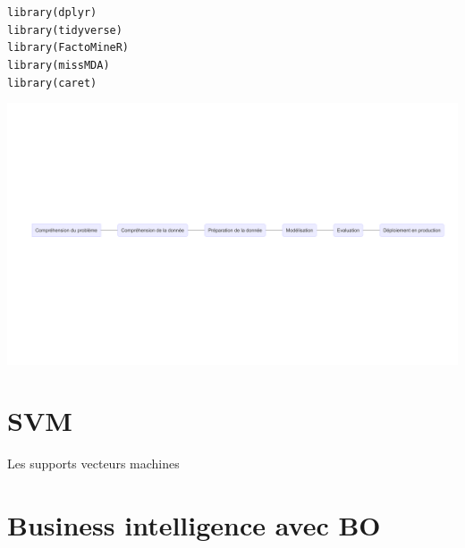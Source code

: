 \documentclass{article}\usepackage[]{graphicx}\usepackage[]{color}
\makeatletter
\def\maxwidth{ %
  \ifdim\Gin@nat@width>\linewidth
    \linewidth
  \else
    \Gin@nat@width
  \fi
}
\newcommand{\hlstd}[1]{\textcolor[rgb]{0,0,0}{#1}}%
\newcommand{\hlkwd}[1]{\textcolor[rgb]{0.004,0.004,0.506}{#1}}%
\newenvironment{kframe}{%
 \def\at@end@of@kframe{}%
 \ifinner\ifhmode%
  \def\at@end@of@kframe{\end{minipage}}%
  \begin{minipage}{\columnwidth}%
 \fi\fi%
 \def\FrameCommand##1{\hskip\@totalleftmargin \hskip-\fboxsep
 \colorbox{shadecolor}{##1}\hskip-\fboxsep
     \hskip-\linewidth \hskip-\@totalleftmargin \hskip\columnwidth}%
 \MakeFramed {\advance\hsize-\width
   \@totalleftmargin\z@ \linewidth\hsize
   \@setminipage}}%
 {\par\unskip\endMakeFramed%
 \at@end@of@kframe}
\newenvironment{knitrout}{}{} %
\makeatother
\begin{document}
\begin{knitrout}
\color{fgcolor}\begin{kframe}
\begin{alltt}
\hlkwd{library}\hlstd{(dplyr)}
\hlkwd{library}\hlstd{(tidyverse)}
\hlkwd{library}\hlstd{(FactoMineR)}
\hlkwd{library}\hlstd{(missMDA)}
\hlkwd{library}\hlstd{(caret)}
\end{alltt}
\end{kframe}
\end{knitrout}

\begin{knitrout}
\color{fgcolor}
\includegraphics[width=\maxwidth]{figure/unnamed-chunk-3-1} 
\end{knitrout}




\section{SVM}
Les supports vecteurs machines
\section{Business intelligence avec BO}


\end{document}
